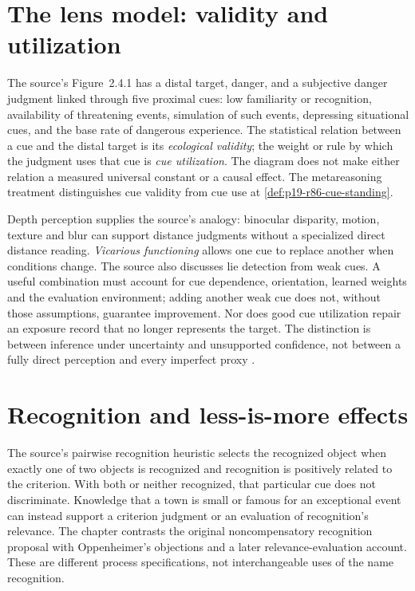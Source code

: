 \section{The lens model: validity and utilization}
\label{sec:p19-r24-lens}

The source's Figure~2.4.1 has a distal target, danger, and a subjective
danger judgment linked through five proximal cues: low familiarity or
recognition, availability of threatening events, simulation of such
events, depressing situational cues, and the base rate of dangerous
experience. The statistical relation between a cue and the distal target
is its \emph{ecological validity}; the weight or rule by which the
judgment uses that cue is \emph{cue utilization}. The diagram does not
make either relation a measured universal constant or a causal effect.
The metareasoning treatment distinguishes cue validity from cue use at
\cref{def:p19-r86-cue-standing}.

Depth perception supplies the source's analogy: binocular disparity,
motion, texture and blur can support distance judgments without a
specialized direct distance reading. \emph{Vicarious functioning}
allows one cue to replace another when conditions change. The source
also discusses lie detection from weak cues. A useful combination must
account for cue dependence, orientation, learned weights and the
evaluation environment; adding another weak cue does not, without
those assumptions, guarantee improvement. Nor does good cue utilization
repair an exposure record that no longer represents the target.
The distinction is between inference under uncertainty and unsupported
confidence, not between a fully direct perception and every imperfect
proxy \cite[pp.~162--163]{FiedlerPragerMcCaughey2021Heuristics}.

\section{Recognition and less-is-more effects}
\label{sec:p19-r24-recognition}

The source's pairwise recognition heuristic selects the recognized
object when exactly one of two objects is recognized and recognition
is positively related to the criterion. With both or neither recognized,
that particular cue does not discriminate. Knowledge that a town is
small or famous for an exceptional event can instead support a criterion
judgment or an evaluation of recognition's relevance. The chapter
contrasts the original noncompensatory recognition proposal with
Oppenheimer's objections and a later relevance-evaluation account.
These are different process specifications, not interchangeable uses
of the name recognition.


